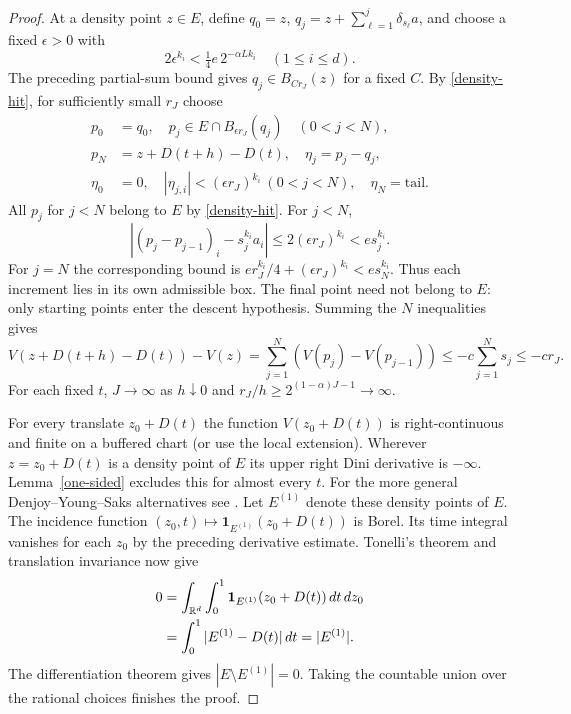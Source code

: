 \begin{proof}
At a density point $z\in E$, define $q_0=z$,
$q_j=z+\sum_{\ell=1}^j\delta_{s_\ell}a$, and choose a fixed $\epsilon>0$ with
\[
 2\epsilon^{k_i}<\tfrac14 e\,2^{-\alpha L k_i}\quad(1\le i\le d).
\]
The preceding partial-sum bound gives $q_j\in B_{Cr_J}(z)$ for a fixed $C$.
By \eqref{density-hit}, for sufficiently small $r_J$ choose
\[
 \begin{aligned}
 p_0&=q_0,\quad p_j\in E\cap B_{\epsilon r_J}(q_j)\quad(0<j<N),\\
 p_N&=z+D(t+h)-D(t),\quad \eta_j=p_j-q_j,\\
 \eta_0&=0,\quad |\eta_{j,i}|<(\epsilon r_J)^{k_i}\ (0<j<N),\quad
 \eta_N=\mathrm{tail}.
 \end{aligned}
\]
All $p_j$ for $j<N$ belong to $E$ by \eqref{density-hit}. For $j<N$,
\[
 |(p_j-p_{j-1})_i-s_j^{k_i}a_i|
 \le 2(\epsilon r_J)^{k_i}< e s_j^{k_i}.
\]
For $j=N$ the corresponding bound is
$e r_J^{k_i}/4+(\epsilon r_J)^{k_i}<e s_N^{k_i}$.
Thus each increment lies in its own admissible box. The final point need
not belong to $E$: only starting points enter the descent hypothesis.
Summing the $N$ inequalities gives
\begin{equation}\label{clock-sum}
 V(z+D(t+h)-D(t))-V(z)
 =\sum_{j=1}^N (V(p_j)-V(p_{j-1}))
 \le -c\sum_{j=1}^N s_j\le -c r_J .
\end{equation}
For each fixed $t$, $J\to\infty$ as $h\downarrow0$ and
$r_J/h\ge 2^{(1-\alpha)J-1}\to\infty$.

For every translate $z_0+D(t)$ the function $V(z_0+D(t))$ is
right-continuous and finite on a buffered chart (or use the local
extension). Wherever $z=z_0+D(t)$ is a density point of $E$ its
upper right Dini derivative is $-\infty$. Lemma~\ref{one-sided}
excludes this for almost every $t$. For the more general
Denjoy--Young--Saks alternatives see \cite[Remark 2.10]{rifford}.
Let $E^{(1)}$ denote these density points of $E$. The incidence function
$(z_0,t)\mapsto\mathbf1_{E^{(1)}}(z_0+D(t))$ is Borel. Its time integral
vanishes for each $z_0$ by the preceding derivative estimate. Tonelli's
theorem and translation invariance now give
\begin{equation}\label{incidence}
 \begin{aligned}
 0&=\int_{\mathbb R^d}\int_0^1 \mathbf1_{E^{(1)}}(z_0+D(t))\,dt\,dz_0\\
  &=\int_0^1 |E^{(1)}-D(t)|\,dt=|E^{(1)}|.
 \end{aligned}
\end{equation}
The differentiation theorem gives $|E\setminus E^{(1)}|=0$.
Taking the countable union over the rational choices finishes the proof.
\end{proof}

